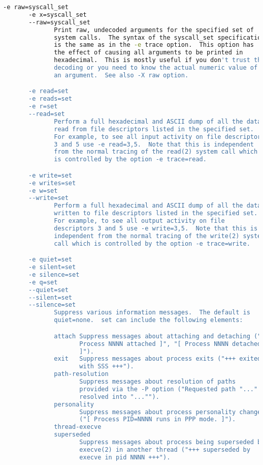 {{\begin{lstlisting}[language=bash]
       -e raw=syscall_set
       -e x=syscall_set
       --raw=syscall_set
              Print raw, undecoded arguments for the specified set of
              system calls.  The syntax of the syscall_set specification
              is the same as in the -e trace option.  This option has
              the effect of causing all arguments to be printed in
              hexadecimal.  This is mostly useful if you don't trust the
              decoding or you need to know the actual numeric value of
              an argument.  See also -X raw option.

       -e read=set
       -e reads=set
       -e r=set
       --read=set
              Perform a full hexadecimal and ASCII dump of all the data
              read from file descriptors listed in the specified set.
              For example, to see all input activity on file descriptors
              3 and 5 use -e read=3,5.  Note that this is independent
              from the normal tracing of the read(2) system call which
              is controlled by the option -e trace=read.

       -e write=set
       -e writes=set
       -e w=set
       --write=set
              Perform a full hexadecimal and ASCII dump of all the data
              written to file descriptors listed in the specified set.
              For example, to see all output activity on file
              descriptors 3 and 5 use -e write=3,5.  Note that this is
              independent from the normal tracing of the write(2) system
              call which is controlled by the option -e trace=write.

       -e quiet=set
       -e silent=set
       -e silence=set
       -e q=set
       --quiet=set
       --silent=set
       --silence=set
              Suppress various information messages.  The default is
              quiet=none.  set can include the following elements:

              attach Suppress messages about attaching and detaching ("[
                     Process NNNN attached ]", "[ Process NNNN detached
                     ]").
              exit   Suppress messages about process exits ("+++ exited
                     with SSS +++").
              path-resolution
                     Suppress messages about resolution of paths
                     provided via the -P option ("Requested path "..."
                     resolved into "..."").
              personality
                     Suppress messages about process personality changes
                     ("[ Process PID=NNNN runs in PPP mode. ]").
              thread-execve
              superseded
                     Suppress messages about process being superseded by
                     execve(2) in another thread ("+++ superseded by
                     execve in pid NNNN +++").


\end{lstlisting}}}
